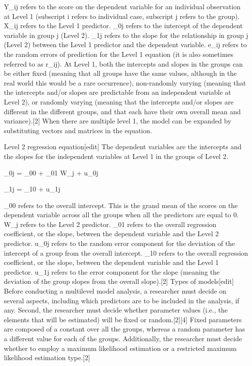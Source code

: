Y_{ij}  refers to the score on the dependent variable for an individual observation at Level 1 (subscript i refers to individual case, subscript j refers to the group).
X_{ij}   refers to the Level 1 predictor.
\beta_{0j}   refers to the intercept of the dependent variable in group j (Level 2).
 \beta_{1j} refers to the slope for the relationship in group j (Level 2) between the Level 1 predictor and the dependent variable.
 e_{ij} refers to the random errors of prediction for the Level 1 equation (it is also sometimes referred to as r_{ij}). At Level 1, both the intercepts and slopes in the groups can be either fixed (meaning that all groups have the same values, although in the real world this would be a rare occurrence), non-randomly varying (meaning that the intercepts and/or slopes are predictable from an independent variable at Level 2), or randomly varying (meaning that the intercepts and/or slopes are different in the different groups, and that each have their own overall mean and variance).[2]
When there are multiple level 1, the model can be expanded by substituting vectors and matrices in the equation.

Level 2 regression equation[edit]
The dependent variables are the intercepts and the slopes for the independent variables at Level 1 in the groups of Level 2.

\beta_{0j} = \gamma_{00} + \gamma_{01} W_j + u_{0j}

\beta_{1j} = \gamma_{10} + u_{1j}

\gamma_{00} refers to the overall intercept. This is the grand mean of the scores on the dependent variable across all the groups when all the predictors are equal to 0.
W_j refers to the Level 2 predictor.
\gamma_{01} refers to the overall regression coefficient, or the slope, between the dependent variable and the Level 2 predictor.
u_{0j} refers to the random error component for the deviation of the intercept of a group from the overall intercept.
\gamma_{10} refers to the overall regression coefficient, or the slope, between the dependent variable and the Level 1 predictor.
u_{1j} refers to the error component for the slope (meaning the deviation of the group slopes from the overall slope).[2]
Types of models[edit]
Before conducting a multilevel model analysis, a researcher must decide on several aspects, including which predictors are to be included in the analysis, if any. Second, the researcher must decide whether parameter values (i.e., the elements that will be estimated) will be fixed or random.[2][4] Fixed parameters are composed of a constant over all the groups, whereas a random parameter has a different value for each of the groups. Additionally, the researcher must decide whether to employ a maximum likelihood estimation or a restricted maximum likelihood estimation type.[2]

